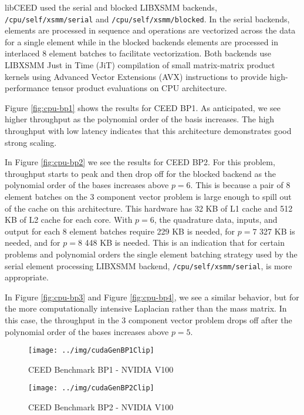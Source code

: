 libCEED used the serial and blocked LIBXSMM \cite{libxsmm} backends, \lstinline{/cpu/self/xsmm/serial} and \lstinline{/cpu/self/xsmm/blocked}.
In the serial backends, elements are processed in sequence and operations are vectorized across the data for a single element while in the blocked backends elements are processed in interlaced 8 element batches to facilitate vectorization.
Both backends use LIBXSMM Just in Time (JiT) compilation of small matrix-matrix product kernels using Advanced Vector Extensions (AVX) instructions to provide high-performance tensor product evaluations on CPU architecture.

Figure \ref{fig:cpu-bp1} shows the results for CEED BP1.
As anticipated, we see higher throughput as the polynomial order of the basis increases.
The high throughput with low latency indicates that this architecture demonstrates good strong scaling.

In Figure \ref{fig:cpu-bp2} we see the results for CEED BP2.
For this problem, throughput starts to peak and then drop off for the blocked backend as the polynomial order of the bases increases above $p = 6$.
This is because a pair of 8 element batches on the 3 component vector problem is large enough to spill out of the cache on this architecture.
This hardware has 32 KB of L1 cache and 512 KB of L2 cache for each core.
With $p = 6$, the quadrature data, inputs, and output for each 8 element batches require 229 KB is needed, for $p = 7$ 327 KB is needed, and for $p = 8$ 448 KB is needed.
This is an indication that for certain problems and polynomial orders the single element batching strategy used by the serial element processing LIBXSMM backend, \lstinline{/cpu/self/xsmm/serial}, is more appropriate.

In Figure \ref{fig:cpu-bp3} and Figure \ref{fig:cpu-bp4}, we see a similar behavior, but for the more computationally intensive Laplacian rather than the mass matrix.
In this case, the throughput in the 3 component vector problem drops off after the polynomial order of the bases increases above $p = 5$.

\begin{figure}[ht!]
\texttt{[image: ../img/cudaGenBP1Clip]}
\caption{CEED Benchmark BP1 - NVIDIA V100}
\label{fig:gpu-bp1}
\end{figure}

\begin{figure}[ht!]
\texttt{[image: ../img/cudaGenBP2Clip]}
\caption{CEED Benchmark BP2 - NVIDIA V100}
\label{fig:gpu-bp2}
\end{figure}

